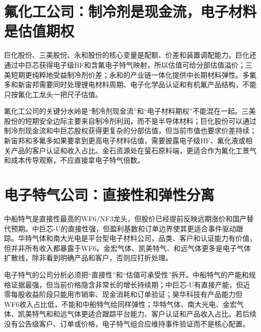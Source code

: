 \section{氟化工公司：制冷剂是现金流，电子材料是估值期权}
巨化股份、三美股份、永和股份的核心变量是配额、价差和装置调配能力。巨化还通过中巨芯获得电子级HF和含氟电子特气映射，所以估值可给分部估值溢价；三美短期更纯粹地受益制冷剂价差；永和的产业链一体化提供中长期材料弹性。多氟多和新宙邦需要同时处理锂电材料周期、电子化学品认证和有机氟产品结构，不能只按氟化工龙头一把尺子估值。

氟化工公司的关键分水岭是“制冷剂现金流”和“电子材料期权”不能混在一起。三美股份的短期安全边际主要来自制冷剂利润，而不是半导体材料；巨化股份可以通过制冷剂现金流和中巨芯股权获得更复杂的分部估值，但当前市值也要求价差持续；新宙邦和多氟多如果要拿到更高电子材料估值，需要披露电子级HF、氟化液或相关产品的客户认证和收入占比。金石资源处在萤石原料端，更适合作为氟化工景气和成本传导观察，不应直接拿电子特气倍数。

\section{电子特气公司：直接性和弹性分离}
中船特气是直接性最高的WF6/NF3龙头，但股价已经提前反映远期涨价和国产替代预期。中巨芯-U的直接性强，但盈利基数和订单边界使其更适合事件驱动跟踪。华特气体和南大光电是平台型电子材料公司，品类、客户和认证能力有价值，但并非所有收入都暴露于WF6。金宏气体、凯美特气、和远气体更多是电子气体扩散线，除非看到明确产品和客户，否则应打折处理。

电子特气的公司分析必须把“直接性”和“估值可承受性”拆开。中船特气的产能和规格证据最强，但当前价格隐含非常长的增长持续期；中巨芯-U有直接产能，但近零每股收益阶段只能用市销率、现金消耗和订单验证；昊华科技有产品能力但WF6收入占比低，不能和中船特气给同样弹性；华特气体、南大光电、金宏气体、凯美特气和和远气体更适合跟踪平台能力、客户认证和产品收入占比。若后续没有公告级客户、订单或价格，电子特气组合应维持事件验证而不是核心配置。
